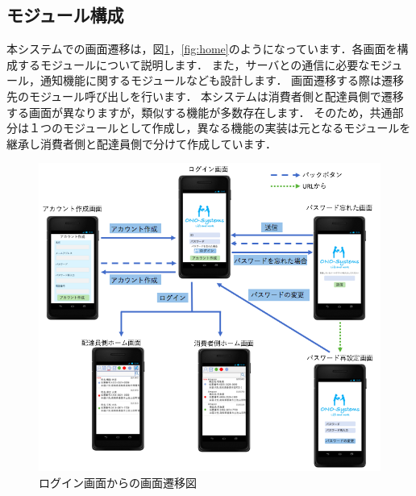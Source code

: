 \documentclass[a4j,titlepage]{jarticle}
\begin{document}
\clearpage

\subsection{モジュール構成}
本システムでの画面遷移は，図\ref{fig:login}，\ref{fig:home}のようになっています．各画面を構成するモジュールについて説明します．
また，サーバとの通信に必要なモジュール，通知機能に関するモジュールなども設計します．
画面遷移する際は遷移先のモジュール呼び出しを行います．
本システムは消費者側と配達員側で遷移する画面が異なりますが，類似する機能が多数存在します．
そのため，共通部分は１つのモジュールとして作成し，異なる機能の実装は元となるモジュールを継承し消費者側と配達員側で分けて作成しています．
\begin{figure}[H]
 \begin{center}
  \includegraphics[width=150mm]{screen_transition_login.png}
  \caption{ログイン画面からの画面遷移図}
  \label{fig:login}
 \end{center}
\end{figure}
\end{document}
